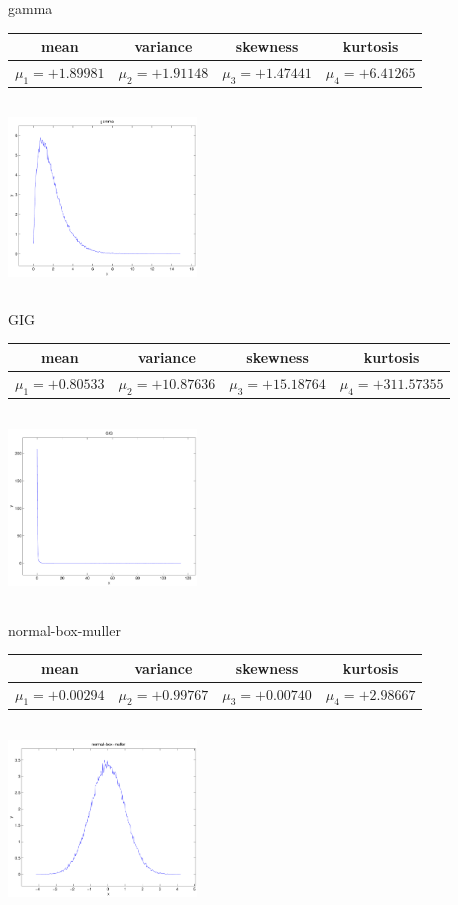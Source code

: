 \documentclass[9pt]{article}
\theoremstyle{plain}
\theoremstyle{definition}
\theoremstyle{remark}
\numberwithin{equation}{section}
\begin{document}
\newpage
gamma \begin{tabular}{|c|c|c|c|}  mean & variance & skewness & kurtosis \\  \hline
$\mu_1 = +1.89981$ & $\mu_2 = +1.91148$ & $\mu_3 = +1.47441$ & $\mu_4 =+6.41265$ \\
\end{tabular}

\includegraphics[width=5cm,height=5cm]{gamma.pdf}

GIG \begin{tabular}{|c|c|c|c|}  mean & variance & skewness & kurtosis \\  \hline
$\mu_1 = +0.80533$ & $\mu_2 = +10.87636$ & $\mu_3 = +15.18764$ & $\mu_4 =+311.57355$ \\
\end{tabular}

\includegraphics[width=5cm,height=5cm]{GIG.pdf}

normal-box-muller \begin{tabular}{|c|c|c|c|}  mean & variance & skewness & kurtosis \\  \hline
$\mu_1 = +0.00294$ & $\mu_2 = +0.99767$ & $\mu_3 = +0.00740$ & $\mu_4 =+2.98667$ \\
\end{tabular}

\includegraphics[width=5cm,height=5cm]{normal-box-muller.pdf}
\end{document}
